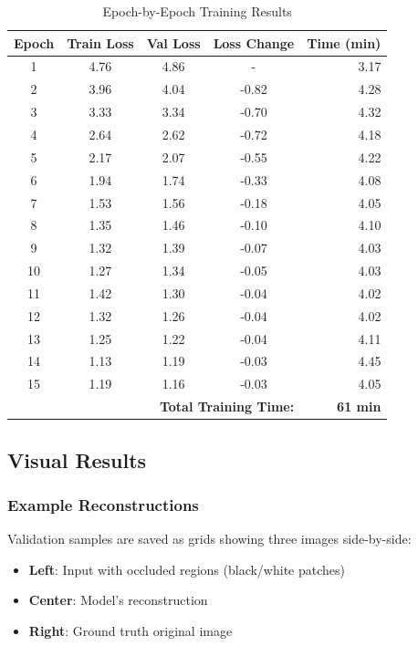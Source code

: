 \documentclass[12pt,a4paper]{article}
\begin{document}
\begin{table}[H]
\centering
\caption{Epoch-by-Epoch Training Results}
\small
\begin{tabular}{@{}ccccr@{}}
\toprule
\textbf{Epoch} & \textbf{Train Loss} & \textbf{Val Loss} & \textbf{Loss Change} & \textbf{Time (min)} \\ \midrule
1 & 4.76 & 4.86 & - & 3.17 \\
2 & 3.96 & 4.04 & -0.82 & 4.28 \\
3 & 3.33 & 3.34 & -0.70 & 4.32 \\
4 & 2.64 & 2.62 & -0.72 & 4.18 \\
5 & 2.17 & 2.07 & -0.55 & 4.22 \\
6 & 1.94 & 1.74 & -0.33 & 4.08 \\
7 & 1.53 & 1.56 & -0.18 & 4.05 \\
8 & 1.35 & 1.46 & -0.10 & 4.10 \\
9 & 1.32 & 1.39 & -0.07 & 4.03 \\
10 & 1.27 & 1.34 & -0.05 & 4.03 \\
11 & 1.42 & 1.30 & -0.04 & 4.02 \\
12 & 1.32 & 1.26 & -0.04 & 4.02 \\
13 & 1.25 & 1.22 & -0.04 & 4.11 \\
14 & 1.13 & 1.19 & -0.03 & 4.45 \\
15 & 1.19 & 1.16 & -0.03 & 4.05 \\ \midrule
\multicolumn{4}{r}{\textbf{Total Training Time:}} & \textbf{61 min} \\ \bottomrule
\end{tabular}
\end{table}

\subsection{Visual Results}

\subsubsection{Example Reconstructions}

Validation samples are saved as grids showing three images side-by-side:
\begin{itemize}
    \item \textbf{Left}: Input with occluded regions (black/white patches)
    \item \textbf{Center}: Model's reconstruction
    \item \textbf{Right}: Ground truth original image
\end{itemize}
\end{document}
